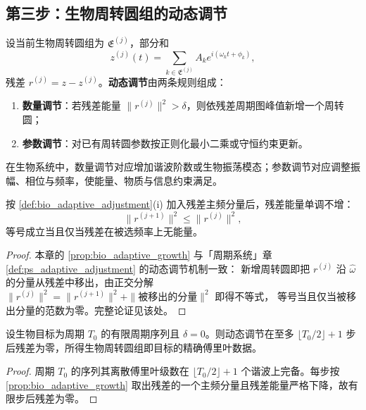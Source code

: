 \subsection{第三步：生物周转圆组的动态调节}

\begin{definition}[生物周转圆组的动态调节]\label{def:bio_adaptive_adjustment}
设当前生物周转圆组为 $\mathfrak E^{(j)}$，部分和
\[
z^{(j)}(t)=\sum_{k\in\mathfrak E^{(j)}}A_k e^{i(\omega_k t+\phi_k)},
\]
残差 $r^{(j)}=z-z^{(j)}$。\textbf{动态调节}由两条规则组成：
\begin{enumerate}[label=(\roman*)]
    \item \textbf{数量调节}：若残差能量 $\|r^{(j)}\|^2>\delta$，则依残差周期图峰值新增一个周转圆；
    \item \textbf{参数调节}：对已有周转圆参数按正则化最小二乘或守恒约束更新。
\end{enumerate}
在生物系统中，数量调节对应增加谐波阶数或生物振荡模态；参数调节对应调整振幅、相位与频率，使能量、物质与信息约束满足。
\end{definition}

\begin{proposition}[数量调节的单调性]\label{prop:bio_adaptive_growth}
按 \cref{def:bio_adaptive_adjustment}(i) 加入残差主频分量后，残差能量单调不增：
\[
\|r^{(j+1)}\|^2\le\|r^{(j)}\|^2,
\]
等号成立当且仅当残差在被选频率上无能量。
\end{proposition}

\begin{proof}
本章的 \cref{prop:bio_adaptive_growth} 与「周期系统」章 \cref{def:ps_adaptive_adjustment} 的动态调节机制一致：
新增周转圆即把 $r^{(j)}$ 沿 $\hat\omega$ 的分量从残差中移出，由正交分解
$\|r^{(j)}\|^2=\|r^{(j+1)}\|^2+\|\text{被移出的分量}\|^2$ 即得不等式，
等号当且仅当被移出分量的范数为零。完整论证见该处。
\end{proof}

\begin{theorem}[动态调节的收敛性]\label{thm:bio_adaptive_convergence}
设生物目标为周期 $T_0$ 的有限周期序列且 $\delta=0$。则动态调节在至多 $\lfloor T_0/2\rfloor+1$ 步后残差为零，所得生物周转圆组即目标的精确傅里叶数据。
\end{theorem}

\begin{proof}
周期 $T_0$ 的序列其离散傅里叶级数在 $\lfloor T_0/2\rfloor+1$ 个谐波上完备。每步按 \cref{prop:bio_adaptive_growth} 取出残差的一个主频分量且残差能量严格下降，故有限步后残差为零。
\end{proof}


